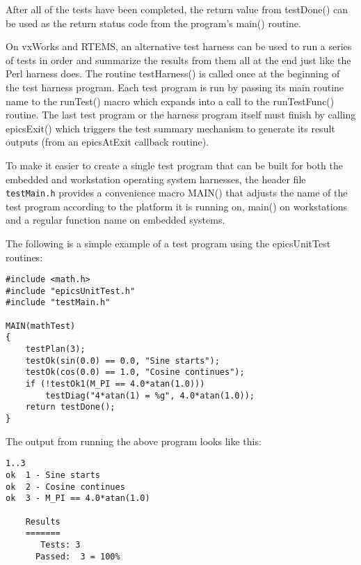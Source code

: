 After all of the tests have been completed, the return value from testDone() can be used as the return status code from the 
program's main() routine.

On vxWorks and RTEMS, an alternative test harness can be used to run a series of tests in order and summarize the results 
from them all at the end just like the Perl harness does. The routine testHarness() is called once at the beginning of the test 
harness program. Each test program is run by passing its main routine name to the runTest() macro which expands into a 
call to the runTestFunc() routine. The last test program or the harness program itself must finish by calling epicsExit() 
which triggers the test summary mechanism to generate its result outputs (from an epicsAtExit callback routine).

To make it easier to create a single test program that can be built for both the embedded and workstation operating system 
harnesses, the header file \verb|testMain.h| provides a convenience macro MAIN() that adjusts the name of the test program 
according to the platform it is running on, main() on workstations and a regular function name on embedded systems.

The following is a simple example of a test program using the epicsUnitTest routines:

\begin{verbatim}
#include <math.h>
#include "epicsUnitTest.h"
#include "testMain.h"

MAIN(mathTest)
{
    testPlan(3);
    testOk(sin(0.0) == 0.0, "Sine starts");
    testOk(cos(0.0) == 1.0, "Cosine continues");
    if (!testOk1(M_PI == 4.0*atan(1.0)))
        testDiag("4*atan(1) = %g", 4.0*atan(1.0));
    return testDone();
}
\end{verbatim}

The output from running the above program looks like this:

\begin{verbatim}
1..3
ok  1 - Sine starts
ok  2 - Cosine continues
ok  3 - M_PI == 4.0*atan(1.0)

    Results
    =======
       Tests: 3
      Passed:  3 = 100%

\end{verbatim}
